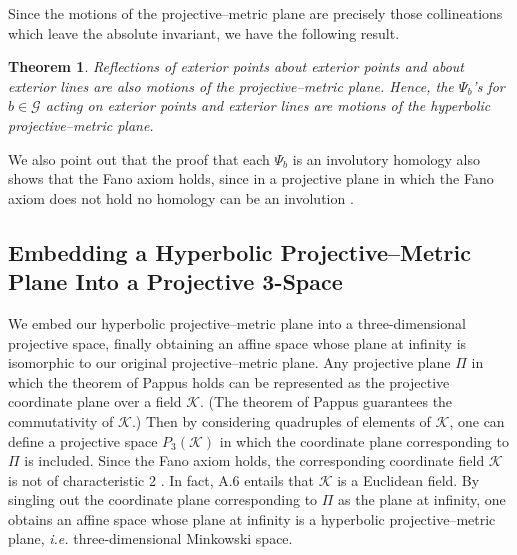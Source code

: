 \documentclass[a4paper,twoside,12pt]{article}
\newtheorem{theorem}{Theorem}[section]
\begin{document}
     Since the motions of the projective--metric plane are precisely those
collineations which leave the absolute invariant, we have the 
following result.

\begin{theorem} Reflections of exterior points about exterior points
and about exterior lines are also motions of the projective--metric plane.
Hence, the $\Psi_{b}$'s for $b\in \mathcal{G}$ acting on exterior points
and exterior lines are motions of the hyperbolic projective--metric plane.
\end{theorem} 

     We also point out that the proof that each $\Psi_{b}$ is an involutory
homology also shows that the Fano axiom holds, since in a projective plane
in which the Fano axiom does not hold no homology can be an involution 
\cite{BL}.


\subsection{Embedding a Hyperbolic Projective--Metric Plane Into a Projective
3-Space}

     We embed our hyperbolic projective--metric plane into a
three-dimensional projective space, finally obtaining an affine space
whose plane at infinity is isomorphic to our original
projective--metric plane. Any projective plane $\Pi$ in which the
theorem of Pappus holds can be represented as the projective
coordinate plane over a field $\mathcal{K}$. (The theorem of Pappus
guarantees the commutativity of $\mathcal{K}$.) Then by considering
quadruples of elements of $\mathcal{K}$, one can define a projective
space $P_{3}(\mathcal{K})$ in which the coordinate plane corresponding
to $\Pi$ is included. Since the Fano axiom holds, the corresponding
coordinate field $\mathcal{K}$ is not of characteristic 2
\cite{BL}. In fact, A.6 entails that $\mathcal{K}$ is a Euclidean
field. By singling out the coordinate plane corresponding to $\Pi$
as the plane at infinity, one obtains an affine space whose plane at
infinity is a hyperbolic projective--metric plane, {\it i.e.}
three-dimensional Minkowski space.
\end{document}
